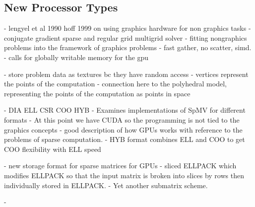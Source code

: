 \subsection{New Processor Types}

\cite{bolz2003sparse}
- lengyel et al 1990 hoff 1999 on using graphics hardware for non graphics tasks
- conjugate gradient sparse and regular grid multigrid solver
- fitting nongraphics problems into the framework of graphics problems
- fast gather, no scatter, simd.
- calls for globally writable memory for the gpu

\cite{fan2004gpu}
- store problem data as textures bc they have random access
- vertices represent the points of the computation
- connection here to the polyhedral model, representing the points of the computation as points in space


\cite{bell2009implementing,bell2008efficient}
- DIA ELL CSR COO HYB
- Examines implementations of SpMV for different formats
- At this point we have CUDA so the programming is not tied to the graphics concepts
- good description of how GPUs works with reference to the problems of sparse computation.
- HYB format combines ELL and COO to get COO flexibility with ELL speed


\cite{baskaran2009optimizing}

\cite{monakov2010automatically}
- new storage format for sparse matrices for GPUs
- sliced ELLPACK which modifies ELLPACK so that the input matrix is broken into slices by rows then individually stored in ELLPACK. 
- Yet another submatrix scheme.



\cite{williams2007optimization}
- 

